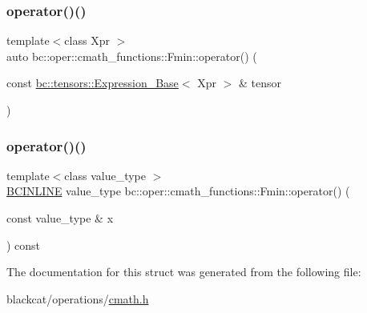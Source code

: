 \mbox{\label{structbc_1_1oper_1_1cmath__functions_1_1Fmin_af0d78498cbe0a60da3786c4d25c42f9b}} 
\subsubsection{\texorpdfstring{operator()()}{operator()()}\hspace{0.1cm}{\footnotesize\ttfamily [2/3]}}
{\footnotesize\ttfamily template$<$class Xpr $>$ \\
auto bc\+::oper\+::cmath\+\_\+functions\+::\+Fmin\+::operator() (\begin{DoxyParamCaption}\item[{const \hyperlink{classbc_1_1tensors_1_1Expression__Base}{bc\+::tensors\+::\+Expression\+\_\+\+Base}$<$ Xpr $>$ \&}]{tensor }\end{DoxyParamCaption})\hspace{0.3cm}{\ttfamily [inline]}}

\mbox{\label{structbc_1_1oper_1_1cmath__functions_1_1Fmin_af12aa0b02156524b71a0b5661ba90a25}} 
\subsubsection{\texorpdfstring{operator()()}{operator()()}\hspace{0.1cm}{\footnotesize\ttfamily [3/3]}}
{\footnotesize\ttfamily template$<$class value\+\_\+type $>$ \\
\hyperlink{common_8h_a6699e8b0449da5c0fafb878e59c1d4b1}{B\+C\+I\+N\+L\+I\+NE} value\+\_\+type bc\+::oper\+::cmath\+\_\+functions\+::\+Fmin\+::operator() (\begin{DoxyParamCaption}\item[{const value\+\_\+type \&}]{x }\end{DoxyParamCaption}) const\hspace{0.3cm}{\ttfamily [inline]}}



The documentation for this struct was generated from the following file\+:\begin{DoxyCompactItemize}
\item 
blackcat/operations/\hyperlink{cmath_8h}{cmath.\+h}\end{DoxyCompactItemize}
